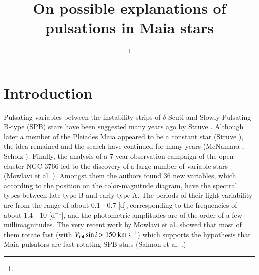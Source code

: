 \documentclass[epj,twocolumn]{webofc}
\newcommand{\kmps}{\;{\rm km\;s^{{-}1}}}
\begin{document}
\title{On possible explanations of pulsations in Maia stars}
%

\author{ \fnsep\thanks{} \and
          \and
         
}


%
\maketitle
%
\section{Introduction}
\label{intro}
Pulsating variables between the instability strips of $\delta$ Scuti and Slowly Pulsating B-type (SPB) stars have been suggested many years ago by Struve \cite{1955S&T....14..492S}.
Although later a member of the Pleiades Maia appeared to be a constant star (Struve \citep{1957ApJ...125..115S}), the idea remained and the search have continued for many years
(McNamara \citep{1985ApJ...289..213M}, Scholz \citep{1998A&A...337..447S}).
Finally, the analysis of a 7-year observation campaign of the open cluster NGC 3766 led to the discovery
of a large number of variable stars (Mowlavi et al. \citep{2013A&A...554A.108M}). Amongst them the authors found 36 new variables, which according to the position on the color-magnitude diagram,
have the spectral types between late type B and early type A. The periods of their light variability are from the range of about 0.1 - 0.7 [d],
corresponding to the frequencies of about 1.4 - 10 [d$^{-1}$], and the photometric amplitudes are of the order of a few millimagnitudes.
The very recent work by Mowlavi et al. \cite{2016arXiv161001077M} showed that most of them rotate fast (with $V_{\rm rot}\sin i >150 \kmps$)
which supports the hypothesis that Maia pulsators are fast rotating SPB stars (Salmon et al. \citep{2014A&A...569A..18S}.)
\end{document}
